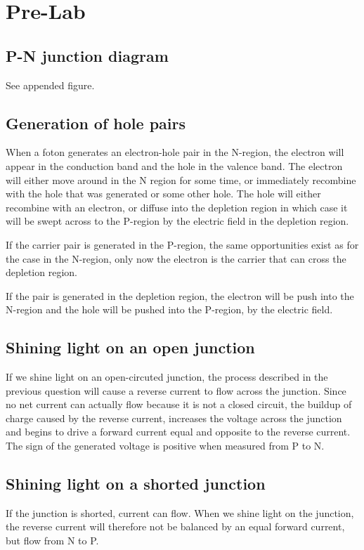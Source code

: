 


\newpage
\section{Pre-Lab}
\subsection{P-N junction diagram}
See appended figure.
\subsection{Generation of hole pairs}
When a foton generates an electron-hole pair in the N-region, the electron will appear in the conduction band and
the hole in the valence band. The electron will either move around in the N region for some time, or immediately recombine
with the hole that was generated or some other hole. The hole will either recombine with an electron, or diffuse into
the depletion region in which case it will be swept across to the P-region by the electric field in the depletion region.

If the carrier pair is generated in the P-region, the same opportunities exist as for the case in the N-region, only 
now the electron is the carrier that can cross the depletion region.

If the pair is generated in the depletion region, the electron will be push into the N-region and the hole will be pushed
into the P-region, by the electric field.

\subsection{Shining light on an open junction}
If we shine light on an open-circuted junction, the process described in the previous question will cause a reverse current
to flow across the junction. Since no net current can actually flow because it is not a closed circuit, the buildup of
charge caused by the reverse current, increases the voltage across the junction and begins to drive a forward current
equal and opposite to the reverse current. The sign of the generated voltage is positive when measured from P to N.

\subsection{Shining light on a shorted junction}
If the junction is shorted, current can flow. When we shine light on the junction, the reverse current will therefore 
not be balanced by an equal forward current, but flow from N to P.


